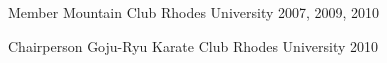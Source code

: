 


\begin{cvhonors}


\cvhonor
{Member} %
{Mountain Club} %
{Rhodes University} %
{2007, 2009, 2010} %
    

\cvhonor
{Chairperson} %
{Goju-Ryu Karate Club} %
{Rhodes University} %
{2010} %
    

\end{cvhonors}